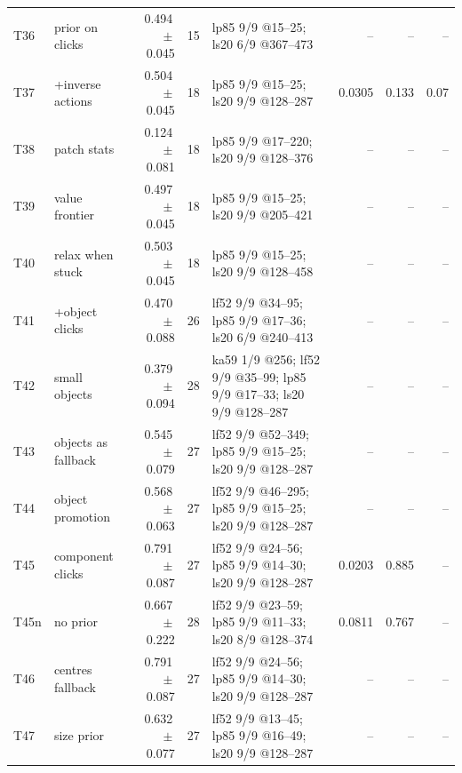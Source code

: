 \begin{tabular}{@{}llrrlrrr@{}}
T36 & prior on clicks & 0.494\,$\pm$\,0.045 & 15 & lp85 9/9 @15--25; ls20 6/9 @367--473 & -- & -- & -- \\
T37 & +inverse actions & 0.504\,$\pm$\,0.045 & 18 & lp85 9/9 @15--25; ls20 9/9 @128--287 & 0.0305 & 0.133 & 0.07 \\
T38 & patch stats & 0.124\,$\pm$\,0.081 & 18 & lp85 9/9 @17--220; ls20 9/9 @128--376 & -- & -- & -- \\
T39 & value frontier & 0.497\,$\pm$\,0.045 & 18 & lp85 9/9 @15--25; ls20 9/9 @205--421 & -- & -- & -- \\
T40 & relax when stuck & 0.503\,$\pm$\,0.045 & 18 & lp85 9/9 @15--25; ls20 9/9 @128--458 & -- & -- & -- \\
T41 & +object clicks & 0.470\,$\pm$\,0.088 & 26 & lf52 9/9 @34--95; lp85 9/9 @17--36; ls20 6/9 @240--413 & -- & -- & -- \\
T42 & small objects & 0.379\,$\pm$\,0.094 & 28 & ka59 1/9 @256; lf52 9/9 @35--99; lp85 9/9 @17--33; ls20 9/9 @128--287 & -- & -- & -- \\
T43 & objects as fallback & 0.545\,$\pm$\,0.079 & 27 & lf52 9/9 @52--349; lp85 9/9 @15--25; ls20 9/9 @128--287 & -- & -- & -- \\
T44 & object promotion & 0.568\,$\pm$\,0.063 & 27 & lf52 9/9 @46--295; lp85 9/9 @15--25; ls20 9/9 @128--287 & -- & -- & -- \\
T45 & component clicks & 0.791\,$\pm$\,0.087 & 27 & lf52 9/9 @24--56; lp85 9/9 @14--30; ls20 9/9 @128--287 & 0.0203 & 0.885 & -- \\
T45n & no prior & 0.667\,$\pm$\,0.222 & 28 & lf52 9/9 @23--59; lp85 9/9 @11--33; ls20 8/9 @128--374 & 0.0811 & 0.767 & -- \\
T46 & centres fallback & 0.791\,$\pm$\,0.087 & 27 & lf52 9/9 @24--56; lp85 9/9 @14--30; ls20 9/9 @128--287 & -- & -- & -- \\
T47 & size prior & 0.632\,$\pm$\,0.077 & 27 & lf52 9/9 @13--45; lp85 9/9 @16--49; ls20 9/9 @128--287 & -- & -- & -- \\
\bottomrule
\end{tabular}
